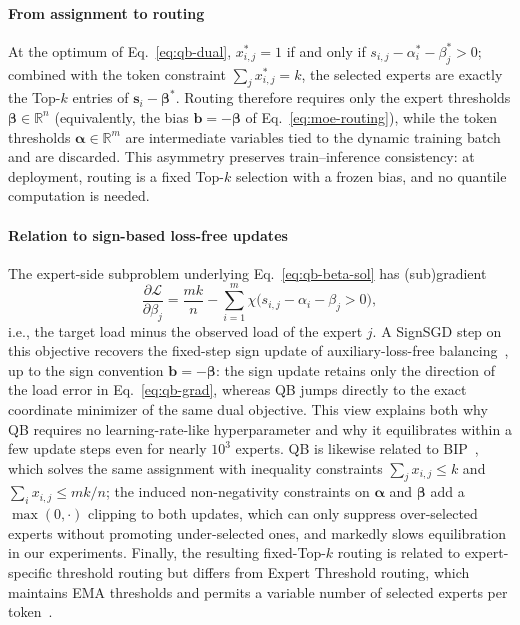 \paragraph{From assignment to routing}
At the optimum of Eq.~\ref{eq:qb-dual}, $x_{i,j}^*=1$ if and only if $s_{i,j}-\alpha_i^*-\beta_j^*>0$; combined with the token constraint $\sum_j x_{i,j}^*=k$, the selected experts are exactly the Top-$k$ entries of $\bm{s}_i-\bm{\beta}^*$.
Routing therefore requires only the expert thresholds $\bm{\beta}\in\mathbb{R}^{n}$ (equivalently, the bias $\bm{b}=-\bm{\beta}$ of Eq.~\ref{eq:moe-routing}), while the token thresholds $\bm{\alpha}\in\mathbb{R}^{m}$ are intermediate variables tied to the dynamic training batch and are discarded.
This asymmetry preserves train--inference consistency: at deployment, routing is a fixed Top-$k$ selection with a frozen bias, and no quantile computation is needed.

\paragraph{Relation to sign-based loss-free updates}
The expert-side subproblem underlying Eq.~\ref{eq:qb-beta-sol} has (sub)gradient
\begin{equation}
    \frac{\partial \mathcal{L}}{\partial \beta_j}
    = \frac{mk}{n} - \sum_{i=1}^{m}\chi\big(s_{i,j}-\alpha_i-\beta_j>0\big),
    \label{eq:qb-grad}
\end{equation}
i.e., the target load minus the observed load of the expert $j$.
A SignSGD step on this objective recovers the fixed-step sign update of auxiliary-loss-free balancing~\citep{deepseekaiv3}, up to the sign convention $\bm{b}=-\bm{\beta}$: the sign update retains only the direction of the load error in Eq.~\ref{eq:qb-grad}, whereas QB jumps directly to the exact coordinate minimizer of the same dual objective.
This view explains both why QB requires no learning-rate-like hyperparameter and why it equilibrates within a few update steps even for nearly $10^3$ experts.
QB is likewise related to BIP~\citep{sun2025bip}, which solves the same assignment with inequality constraints $\sum_j x_{i,j}\le k$ and $\sum_i x_{i,j}\le mk/n$; the induced non-negativity constraints on $\bm{\alpha}$ and $\bm{\beta}$ add a $\max(0,\cdot)$ clipping to both updates, which can only suppress over-selected experts without promoting under-selected ones, and markedly slows equilibration in our experiments.
Finally, the resulting fixed-Top-$k$ routing is related to expert-specific threshold routing but differs from Expert Threshold routing, which maintains EMA thresholds and permits a variable number of selected experts per token~\citep{sun2026expertthreshold}.

